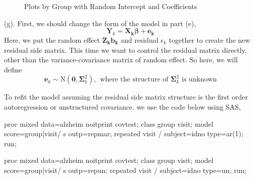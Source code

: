 \documentclass[letterpaper, 12pt]{article}
\begin{document}
\begin{figure}[htbp]
	\caption{Plots by Group with Random Intercept and Coefficients}
	\label{plot3}
	\centering
\end{figure}


(g). First, we should change the form of the model in part (e), 
$$
\bm{Y}_k=\bm{X_k\beta+e_k}
$$
Here, we put the random effect $\bm{Z_kb_k}$ and residual $\epsilon_k$ together to create the new residual side matrix. This time we want to control the residual matrix directly, other than the variance-covariance matrix of random effect. So here, we will define
$$
\bm{e}_k\sim\text{N}(\bm{0},\bm{\Sigma}_k^2),\ \ \text{where the structure of }\bm{\Sigma}_k^2\text{ is unknown}
$$

To refit the model assuming the residual side matrix structure is the first order autoregression or unstructured covariance. we use the code below using SAS,
\begin{Sascode}
proc mixed data=alzheim noitprint covtest;
class group visit;
model score=group|visit/ s outp=repmar;
repeated visit / subject=idno type=ar(1);
run;

proc mixed data=alzheim noitprint covtest;
class group visit;
model score=group|visit/ s outp=repun;
repeated visit / subject=idno type=un;
run;
\end{Sascode}
\end{document}
